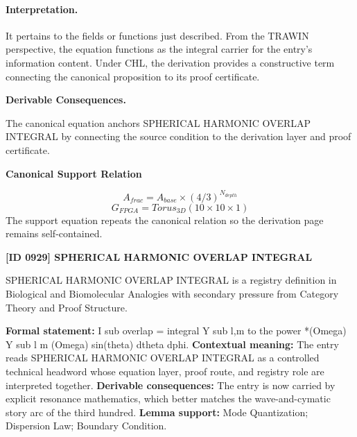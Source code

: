 \paragraph{Interpretation.}
It pertains to the fields or functions just described. From the TRAWIN perspective, the equation functions as the integral carrier for the entry’s information content. Under CHL, the derivation provides a constructive term connecting the canonical proposition to its proof certificate.

\par\vspace{0.35em}
\noindent\textbf{Derivable Consequences.}\quad
\begingroup
\footnotesize
\raggedright
The canonical equation anchors SPHERICAL HARMONIC OVERLAP INTEGRAL by connecting the source condition to the derivation layer and proof certificate.
\par\endgroup

\noindent\textbf{Canonical Support Relation}\par
\[
A_{frac} = A_{base} \times (4/3)^{N_{depth}}
\]
\[
G_{FPGA} = Torus_{3D}(10 \times 10 \times 1)
\]
\noindent The support equation repeats the canonical relation so the derivation page remains self-contained.\par

\clearpage
\noindent\textbf{[ID 0929] SPHERICAL HARMONIC OVERLAP INTEGRAL}\par
\vspace{0.35em}
\begingroup\small
{}
SPHERICAL HARMONIC OVERLAP INTEGRAL is a registry definition in Biological and Biomolecular Analogies with secondary pressure from Category Theory and Proof Structure.

\begingroup\footnotesize\setlength{\emergencystretch}{3em}\sloppy
\textbf{Formal statement:} I sub overlap = integral Y sub l,m to the power *(Omega) Y sub l m (Omega) sin(theta) dtheta dphi. \textbf{Contextual meaning:} The entry reads SPHERICAL HARMONIC OVERLAP INTEGRAL as a controlled technical headword whose equation layer, proof route, and registry role are interpreted together. \textbf{Derivable consequences:} The entry is now carried by explicit resonance mathematics, which better matches the wave-and-cymatic story arc of the third hundred. \textbf{Lemma support:} Mode Quantization; Dispersion Law; Boundary Condition.\par
\endgroup

